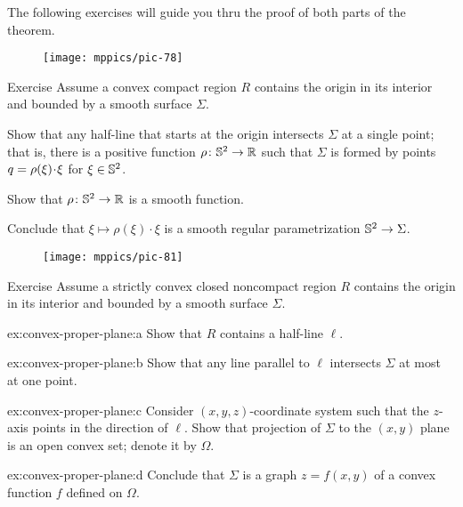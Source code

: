 The following exercises will guide you thru the proof of both parts of the theorem.

{

\begin{wrapfigure}{r}{33 mm}
\vskip-0mm
\centering
\texttt{[image: mppics/pic-78]}
\end{wrapfigure}

\begin{thm}{Exercise}\label{ex:convex-proper-sphere}
Assume a convex compact region $R$ contains the origin in its interior and bounded by a smooth surface $\Sigma$.

\begin{subthm}{}
Show that any half-line that starts at the origin intersects $\Sigma$ at a single point;
that is, there is a positive function $\rho\:\SS^2\z\to\RR$ such that $\Sigma$ is formed by points $q\z=\rho(\xi)\cdot \xi$ for $\xi\in \mathbb{S}^2$.
\end{subthm}

\begin{subthm}{}
Show that $\rho\colon\mathbb{S}^2\to\mathbb{R}$ is a smooth function.
\end{subthm}

\begin{subthm}{}
Conclude that $\xi\mapsto \rho(\xi)\cdot \xi$ is a smooth regular parametrization $\mathbb{S}^2\to \Sigma$.
\end{subthm}

\end{thm}

\begin{wrapfigure}{r}{33 mm}
\vskip-8mm
\centering
\texttt{[image: mppics/pic-81]}
\end{wrapfigure}

\begin{thm}{Exercise}\label{ex:convex-proper-plane}
Assume a strictly convex closed noncompact region $R$ contains the origin in its interior and bounded by a smooth surface $\Sigma$.

\begin{subthm}{ex:convex-proper-plane:a}
Show that $R$ contains a half-line $\ell$.
\end{subthm}

\begin{subthm}{ex:convex-proper-plane:b}
Show that any line parallel to $\ell$ intersects $\Sigma$ at most at one point.
\end{subthm}


\begin{subthm}{ex:convex-proper-plane:c}
Consider $(x,y,z)$-coordinate system such that the $z$-axis points in the direction of $\ell$.
Show that projection of $\Sigma$ to the $(x,y)$ plane is an open convex set; denote it by $\Omega$.
\end{subthm}

\begin{subthm}{ex:convex-proper-plane:d}
 Conclude that $\Sigma$ is a graph $z=f(x,y)$ of a convex function $f$ defined on $\Omega$. 
\end{subthm}

\end{thm}



}

